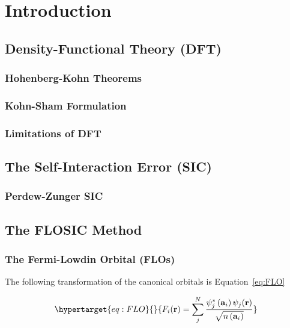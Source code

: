 \documentclass[12pt,a4paper,]{report}
\begin{document}
\chapter{Introduction}\label{introduction}

\section{Density-Functional Theory
(DFT)}\label{density-functional-theory-dft}

\subsection{Hohenberg-Kohn Theorems}\label{hohenberg-kohn-theorems}

\subsection{Kohn-Sham Formulation}\label{kohn-sham-formulation}

\subsection{Limitations of DFT}\label{limitations-of-dft}

\section{The Self-Interaction Error
(SIC)}\label{the-self-interaction-error-sic}

\subsection{Perdew-Zunger SIC}\label{perdew-zunger-sic}

\section{The FLOSIC Method}\label{the-flosic-method}

\subsection{The Fermi-Lowdin Orbital
(FLOs)}\label{the-fermi-lowdin-orbital-flos}

The following transformation of the canonical orbitals is
Equation~\ref{eq:FLO}

\begin{equation}\protect\hypertarget{eq:FLO}{}{F_i(\mathbf{r})=\sum_j^N \frac{\psi_j^*\left(\mathbf{a}_i\right) \psi_j(\mathbf{r})}{\sqrt{n\left(\mathbf{a}_i\right)}}}\label{eq:FLO}\end{equation}
\end{document}

